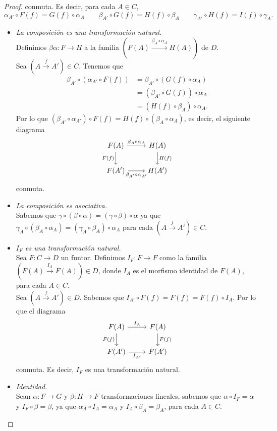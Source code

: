 \documentclass[12pt,letterpaper,titlepage]{article}
\theoremstyle{definition}
\newcommand\<{\langle}
\renewcommand\>{\rangle}
\begin{document}
\begin{proof}
conmuta. Es decir, para cada $A\in C$,
\[\alpha_{A'}\circ F(f)=G(f)\circ \alpha_A \qquad \beta_{A'}\circ G(f)=H(f)\circ \beta_A \qquad \gamma_{A'}\circ H(f)=I(f)\circ \gamma_A.\]
\begin{itemize}
\item[\blacksmiley{}] \textit{La composición es una transformación natural.}\\ Definimos $\beta\alpha\colon F\to H$ a la familia $(F(A)\xrightarrow{\beta_A\circ \alpha_A} H(A))$ de $D$.\\
Sea $(A\xrightarrow{f}A')\in C$. Tenemos que
\begin{align*}
\beta_{A'}\circ(\alpha_{A'}\circ F(f))&=\beta_{A'}\circ(G(f)\circ \alpha_A)\\
&=(\beta_{A'}\circ G(f))\circ \alpha_A\\
&=(H(f)\circ\beta_A)\circ\alpha_A.
\end{align*}
Por lo que $(\beta_{A'}\circ\alpha_{A'})\circ F(f)=H(f)\circ(\beta_A\circ\alpha_A)$, es decir, el siguiente diagrama
\[
\begin{tikzcd}
F(A) \arrow[d, "F(f)"'] \arrow[r, "\beta_A\circ \alpha_A"] & H(A) \arrow[d, "H(f)"] \\
F(A') \arrow[r, "\beta_{A'}\circ\alpha_{A'}"']             & H(A')                 
\end{tikzcd}
\]
conmuta.
\item[\blacksmiley{}] \textit{La composición es asociativa.}\\
Sabemos que $\gamma\circ (\beta\circ\alpha)=(\gamma\circ\beta)\circ\alpha$ ya que $\gamma_A\circ(\beta_A\circ\alpha_A)=(\gamma_A\circ\beta_A)\circ\alpha_A$ para cada $(A\xrightarrow{f} A')\in C$.
\item[\blacksmiley{}] \textit{$I_F$ es una transformación natural.}\\
Sea $F\colon C\to D$ un funtor. Definimos $I_F\colon F\to F$ como la familia $(F(A)\xrightarrow{I_A}F(A))\in D$, donde $I_A$ es el morfismo identidad de $F(A)$, para cada $A\in C$.\\
Sea $(A\xrightarrow{f} A')\in D$. Sabemos que $I_{A'}\circ F(f)=F(f)=F(f)\circ I_A$. Por lo que el diagrama
\[
\begin{tikzcd}
F(A) \arrow[d, "F(f)"'] \arrow[r, "I_A"] & F(A) \arrow[d, "F(f)"] \\
F(A') \arrow[r, "I_{A'}"']               & F(A')                 
\end{tikzcd}
\]
conmuta. Es decir, $I_F$ es una transformación natural.
\item[\blacksmiley{}] \textit{Identidad.}\\
Sean $\alpha\colon F\to G$ y $\beta\colon H\to F$ transformaciones lineales, sabemos que $\alpha\circ I_F=\alpha$ y $I_F\circ \beta=\beta$, ya que $\alpha_A\circ I_A=\alpha_A$ y $I_A\circ\beta_A=\beta_A$, para cada $A\in C$.
\end{itemize}
\end{proof}
\end{document}

